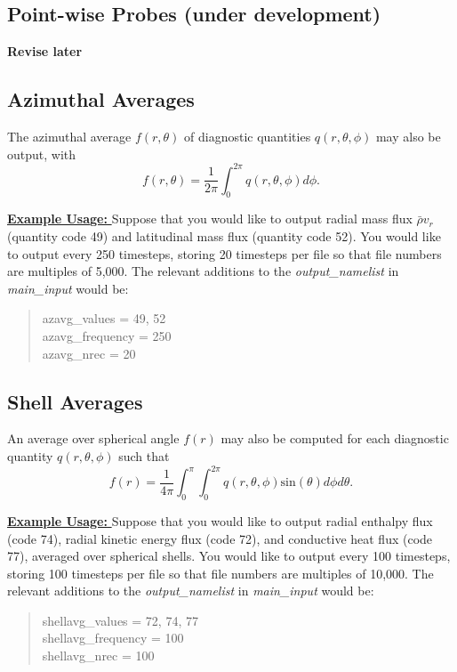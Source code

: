 \documentclass[12pt,letterpaper]{article}
\begin{document}
\subsection{Point-wise Probes (under development)}
\textbf{Revise later}

\subsection{Azimuthal Averages}
The azimuthal average $f(r,\theta)$ of diagnostic quantities $q(r,\theta,\phi)$ may also be output, with
\begin{equation}
\label{eq:azav}
f(r,\theta) = \frac{1}{2\pi}\int_0^{2\pi}q(r,\theta,\phi)d\phi.
\end{equation}


\noindent\underline{\textbf{Example Usage:  }}
Suppose that you would like to output radial mass flux $\bar{\rho}v_r$ (quantity code 49) and latitudinal mass flux (quantity code 52).  You would like to output every 250 timesteps, storing 20 timesteps per file so that file numbers are multiples of 5,000.  The relevant additions to the \textit{output\_namelist} in  \textit{main\_input}  would be:
\blockquote{\noindent azavg\_values = 49, 52
\\
\noindent azavg\_frequency = 250
\\
\noindent azavg\_nrec = 20
}

\subsection{Shell Averages}
An average over spherical angle $f(r)$ may also be computed for each diagnostic quantity $q(r,\theta,\phi)$ such that
\begin{equation}
\label{eq:savg}
f(r) = \frac{1}{4\pi}\int_0^{\pi}\int_0^{2\pi}q(r,\theta,\phi)\mathrm{sin}(\theta)d\phi d\theta.
\end{equation}


\noindent\underline{\textbf{Example Usage:  }}
Suppose that you would like to output radial enthalpy flux (code 74), radial kinetic energy flux (code 72), and conductive heat flux (code 77), averaged over spherical shells.  You would like to output every 100 timesteps, storing 100 timesteps per file so that file numbers are multiples of 10,000.  The relevant additions to the \textit{output\_namelist} in  \textit{main\_input}  would be:
\blockquote{\noindent shellavg\_values = 72, 74, 77
\\
\noindent shellavg\_frequency = 100
\\
\noindent shellavg\_nrec = 100
}
\end{document}
